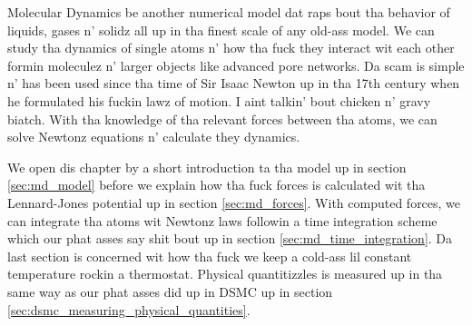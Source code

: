 Molecular Dynamics be another numerical model dat raps bout tha behavior of liquids, gases n' solidz all up in tha finest scale of any old-ass model. We can study tha dynamics of single atoms n' how tha fuck they interact wit each other formin moleculez n' larger objects like advanced pore networks. Da scam is simple n' has been used since tha time of Sir Isaac Newton up in tha 17th century when he formulated his fuckin lawz of motion. I aint talkin' bout chicken n' gravy biatch. With tha knowledge of tha relevant forces between tha atoms, we can solve Newtonz equations n' calculate they dynamics.

We open dis chapter by a short introduction ta tha model up in section \ref{sec:md_model} before we explain how tha fuck forces is calculated wit tha Lennard-Jones potential up in section \ref{sec:md_forces}. With computed forces, we can integrate tha atoms wit Newtonz laws followin a time integration scheme which our phat asses say shit bout up in section \ref{sec:md_time_integration}. Da last section is concerned wit how tha fuck we keep a cold-ass lil constant temperature rockin a thermostat. Physical quantitizzles is measured up in tha same way as our phat asses did up in DSMC up in section \ref{sec:dsmc_measuring_physical_quantities}.